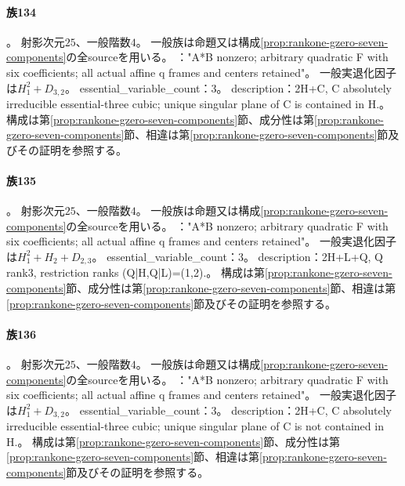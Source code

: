 \paragraph{族134}\label{catalogue:R4_MODULAR_RANK1_GZERO_BINOMIAL_B2_25}
。
射影次元$25$、一般階数$4$。
一般族は命題又は構成\ref{prop:rankone-gzero-seven-components}の全sourceを用いる。
："A*B nonzero; arbitrary quadratic F with six coefficients; all actual affine q frames and centers retained"。
一般実退化因子は$H_{1}^{2}+D_{3,2}$。
essential\_variable\_count：3。
description：2H+C, C absolutely irreducible essential-three cubic; unique singular plane of C is contained in H.。
構成は第\ref{prop:rankone-gzero-seven-components}節、成分性は第\ref{prop:rankone-gzero-seven-components}節、相違は第\ref{prop:rankone-gzero-seven-components}節及びその証明を参照する。

\paragraph{族135}\label{catalogue:R4_MODULAR_RANK1_GZERO_BINOMIAL_B4_25}
。
射影次元$25$、一般階数$4$。
一般族は命題又は構成\ref{prop:rankone-gzero-seven-components}の全sourceを用いる。
："A*B nonzero; arbitrary quadratic F with six coefficients; all actual affine q frames and centers retained"。
一般実退化因子は$H_{1}^{2}+H_{2}+D_{2,3}$。
essential\_variable\_count：3。
description：2H+L+Q, Q rank3, restriction ranks (Q|H,Q|L)=(1,2).。
構成は第\ref{prop:rankone-gzero-seven-components}節、成分性は第\ref{prop:rankone-gzero-seven-components}節、相違は第\ref{prop:rankone-gzero-seven-components}節及びその証明を参照する。

\paragraph{族136}\label{catalogue:R4_MODULAR_RANK1_GZERO_BINOMIAL_B5_25}
。
射影次元$25$、一般階数$4$。
一般族は命題又は構成\ref{prop:rankone-gzero-seven-components}の全sourceを用いる。
："A*B nonzero; arbitrary quadratic F with six coefficients; all actual affine q frames and centers retained"。
一般実退化因子は$H_{1}^{2}+D_{3,2}$。
essential\_variable\_count：3。
description：2H+C, C absolutely irreducible essential-three cubic; unique singular plane of C is not contained in H.。
構成は第\ref{prop:rankone-gzero-seven-components}節、成分性は第\ref{prop:rankone-gzero-seven-components}節、相違は第\ref{prop:rankone-gzero-seven-components}節及びその証明を参照する。

